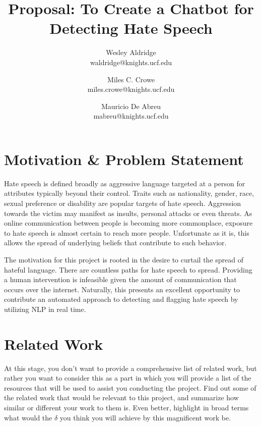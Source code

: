 \documentclass[conference]{sig-alternate-05-2015}
\begin{document}
\title{Proposal: To Create a Chatbot for Detecting Hate Speech}

\author{Wesley Aldridge\\ waldridge@knights.ucf.edu \and Miles C. Crowe  \\ miles.crowe@knights.ucf.edu \and Mauricio De Abreu\\ mabreu@knights.ucf.edu}

\maketitle


\section{Motivation \& Problem Statement}\label{sec:motivation}
Hate speech is defined broadly as aggressive language targeted at a person for attributes typically beyond their control.  Traits such as nationality, gender, race, sexual preference or disability are popular targets of hate speech\cite{Dictionary.com}.  Aggression towards the victim may manifest as insults, personal attacks or even threats.  As online communication between people is becoming more commonplace, exposure to hate speech is almost certain to reach more people.  Unfortunate as it is, this allows the spread of underlying beliefs that contribute to such behavior.

The motivation for this project is rooted in the desire to curtail the spread of hateful language.  There are countless paths for hate speech to spread.  Providing a human intervention is infeasible given the amount of communication  that occurs over the internet.  Naturally, this presents an excellent opportunity to contribute an automated approach to detecting and flagging hate speech by utilizing NLP in real time.

\section{Related Work}\label{sec:related}
\color{red}At this stage, you don't want to provide a comprehensive list of related work, but rather you want to consider this as a part in which you will provide a list of the resources that will be used to assist you conducting the project. Find out some of the related work that would be relevant to this project, and summarize how similar or different your work to them is. Even better, highlight in broad terms what would the $\delta$ you think you will achieve by this magnificent work be. 
\color{black}
\end{document}
